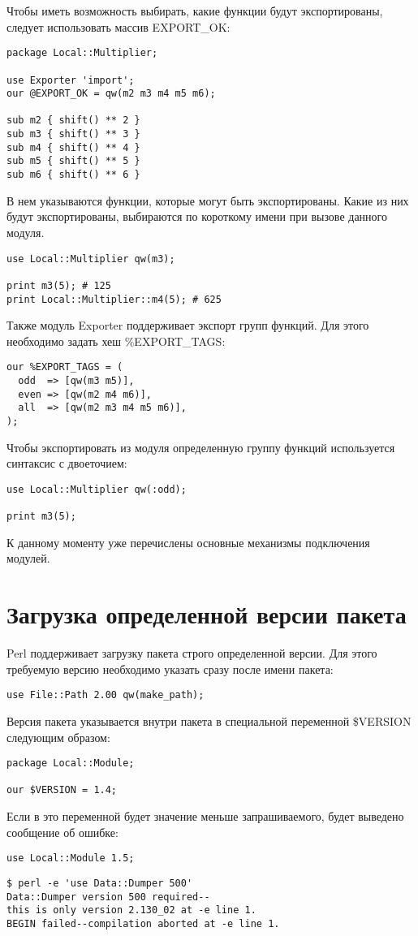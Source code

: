 Чтобы иметь возможность выбирать, какие функции будут экспортированы, следует использовать массив EXPORT\_OK:
\begin{verbatim}
package Local::Multiplier;

use Exporter 'import';
our @EXPORT_OK = qw(m2 m3 m4 m5 m6);

sub m2 { shift() ** 2 }
sub m3 { shift() ** 3 }
sub m4 { shift() ** 4 }
sub m5 { shift() ** 5 }
sub m6 { shift() ** 6 }
\end{verbatim}
В нем указываются функции, которые могут быть экспортированы. Какие из них будут экспортированы, выбираются по короткому имени при вызове данного модуля.
\begin{verbatim}
use Local::Multiplier qw(m3);

print m3(5); # 125
print Local::Multiplier::m4(5); # 625
\end{verbatim}

Также модуль Exporter поддерживает экспорт групп функций. Для этого необходимо задать хеш \%EXPORT\_TAGS:
\begin{verbatim}
our %EXPORT_TAGS = (
  odd  => [qw(m3 m5)],
  even => [qw(m2 m4 m6)],
  all  => [qw(m2 m3 m4 m5 m6)],
);
\end{verbatim}
Чтобы экспортировать из модуля определенную группу функций используется синтаксис с двоеточием:
\begin{verbatim}
use Local::Multiplier qw(:odd);

print m3(5);
\end{verbatim}
К данному моменту уже перечислены основные механизмы подключения модулей.

\section{Загрузка определенной версии пакета}
Perl поддерживает загрузку пакета строго определенной версии. Для этого требуемую версию необходимо указать сразу после имени пакета:
\begin{verbatim}
use File::Path 2.00 qw(make_path);
\end{verbatim}
Версия пакета указывается внутри пакета в специальной переменной \$VERSION следующим образом:
\begin{verbatim}
package Local::Module;

our $VERSION = 1.4;
\end{verbatim}
Если в это переменной будет значение меньше запрашиваемого, будет выведено сообщение об ошибке:
\begin{verbatim}
use Local::Module 1.5;
\end{verbatim}
\begin{verbatim}
$ perl -e 'use Data::Dumper 500'
Data::Dumper version 500 required--
this is only version 2.130_02 at -e line 1.
BEGIN failed--compilation aborted at -e line 1.
\end{verbatim}

